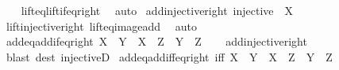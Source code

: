 \begin{isabellebody}
%
\isadelimproof
\ \ %
\endisadelimproof
%
\isatagproof
{}\isamarkupfalse%
\ lift{\isacharunderscore}{\kern0pt}eq{\isacharunderscore}{\kern0pt}lift{\isacharunderscore}{\kern0pt}if{\isacharunderscore}{\kern0pt}eq{\isacharunderscore}{\kern0pt}right\ \isamarkupfalse%
\ auto%
\endisatagproof
{\isafoldproof}%
%
\isadelimproof
\isanewline
%
\endisadelimproof
\isanewline
{}\isamarkupfalse%
\ add{\isacharunderscore}{\kern0pt}injective{\isacharunderscore}{\kern0pt}right{\isacharcolon}{\kern0pt}\ {\isachardoublequoteopen}injective\ {\isacharparenleft}{\kern0pt}{\isacharparenleft}{\kern0pt}{\isacharplus}{\kern0pt}{\isacharparenright}{\kern0pt}\ X{\isacharparenright}{\kern0pt}{\isachardoublequoteclose}\isanewline
%
\isadelimproof
\ \ %
\endisadelimproof
%
\isatagproof
{}\isamarkupfalse%
\ lift{\isacharunderscore}{\kern0pt}injective{\isacharunderscore}{\kern0pt}right\ lift{\isacharunderscore}{\kern0pt}eq{\isacharunderscore}{\kern0pt}image{\isacharunderscore}{\kern0pt}add\ \isamarkupfalse%
\ auto%
\endisatagproof
{\isafoldproof}%
%
\isadelimproof
\isanewline
%
\endisadelimproof
\isanewline
{}\isamarkupfalse%
\ add{\isacharunderscore}{\kern0pt}eq{\isacharunderscore}{\kern0pt}add{\isacharunderscore}{\kern0pt}if{\isacharunderscore}{\kern0pt}eq{\isacharunderscore}{\kern0pt}right{\isacharcolon}{\kern0pt}\ {\isachardoublequoteopen}X\ {\isacharplus}{\kern0pt}\ Y\ {\isacharequal}{\kern0pt}\ X\ {\isacharplus}{\kern0pt}\ Z\ {\isasymLongrightarrow}\ Y\ {\isacharequal}{\kern0pt}\ Z{\isachardoublequoteclose}\isanewline
%
\isadelimproof
\ \ %
\endisadelimproof
%
\isatagproof
{}\isamarkupfalse%
\ add{\isacharunderscore}{\kern0pt}injective{\isacharunderscore}{\kern0pt}right\ \isamarkupfalse%
\ {\isacharparenleft}{\kern0pt}blast\ dest{\isacharcolon}{\kern0pt}\ injectiveD{\isacharparenright}{\kern0pt}%
\endisatagproof
{\isafoldproof}%
%
\isadelimproof
\isanewline
%
\endisadelimproof
\isanewline
{}\isamarkupfalse%
\ add{\isacharunderscore}{\kern0pt}eq{\isacharunderscore}{\kern0pt}add{\isacharunderscore}{\kern0pt}iff{\isacharunderscore}{\kern0pt}eq{\isacharunderscore}{\kern0pt}right\ {\isacharbrackleft}{\kern0pt}iff{\isacharbrackright}{\kern0pt}{\isacharcolon}{\kern0pt}\ {\isachardoublequoteopen}X\ {\isacharplus}{\kern0pt}\ Y\ {\isacharequal}{\kern0pt}\ X\ {\isacharplus}{\kern0pt}\ Z\ {\isasymlongleftrightarrow}\ Y\ {\isacharequal}{\kern0pt}\ Z{\isachardoublequoteclose}\isanewline
%
\isadelimproof
\ \ %
\endisadelimproof
%
\isatagproof
{}\isamarkupfalse%

\end{isabellebody}
